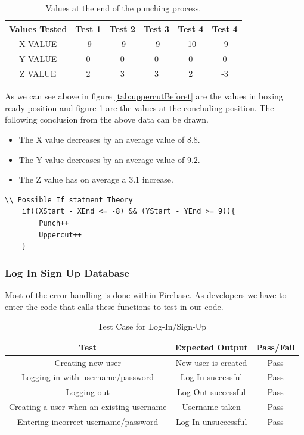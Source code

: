 \documentclass[a4paper,12pt]{report}
\begin{document}
\begin{table}[h]
    \centering
    \begin{tabular}{||c c c c c c||} 
     \hline
     \textbf{Values Tested} & \textbf{Test 1} & \textbf{Test 2} & \textbf{Test 3} & \textbf{Test 4} & \textbf{Test 4} \\ [0.5ex] 
     \hline\hline
     X VALUE & -9 & -9 & -9 & -10 & -9\\ 
     \hline
     Y VALUE & 0 & 0 & 0 & 0 & 0\\  
     \hline
     Z VALUE & 2 & 3 & 3 & 2 & -3\\
     \hline
    \end{tabular}
    \caption{Values at the end of the punching process.}
    \label{tab:uppercutAfter}
\end{table}

As we can see above in figure \ref{tab:uppercutBeforet} are the values in boxing ready position and figure \ref{tab:uppercutAfter} are the values at the concluding position.
The following conclusion from the above data can be drawn.\newpage
\begin{itemize}
    \item The X value decreases by an average value of 8.8.
    \item The Y value decreases by an average value of 9.2.
    \item The Z value has on average a 3.1 increase.
\end{itemize}
\begin{verbatim}
\\ Possible If statment Theory
    if((XStart - XEnd <= -8) && (YStart - YEnd >= 9)){
        Punch++
        Uppercut++
    }
\end{verbatim}

\subsubsection{Log In Sign Up Database}
Most of the error handling is done within Firebase. As developers we have to enter the code that calls these functions to test in our code.  

\begin{table}[h]
    \centering
    \begin{tabular}{||c c c||} 
     \hline
     \textbf{Test} & \textbf{Expected Output} & \textbf{Pass/Fail} \\ [0.5ex] 
     \hline\hline
     Creating new user & New user is created & Pass \\ 
     \hline
     Logging in with username/password & Log-In successful & Pass \\  
     \hline
     Logging out & Log-Out successful & Pass \\
     \hline
     Creating a user when an existing username & Username taken & Pass \\
     \hline
     Entering incorrect username/password & Log-In unsuccessful & Pass \\
     \hline
    \end{tabular}
    \caption{Test Case for Log-In/Sign-Up}
    \label{tab:LogInTest}
\end{table}
\end{document}
